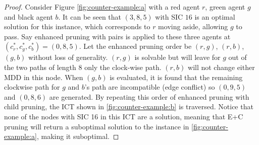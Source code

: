 \documentclass[english,10pt]{article}
\begin{document}
	\begin{proof}
		Consider Figure \ref{fig:counter-example:a} with a red agent $r$, green agent $g$ and black agent $b$. It can be seen that $(3,8,5)$ with SIC $16$ is an optimal solution for this instance, which corresponds to $r$ moving aside, allowing $g$ to pass.  Say enhanced pruning with pairs is applied to these three agents at $(c^*_r,c^*_g,c^*_b) = (0,8,5)$. Let the enhanced pruning order be $(r,g)$, $(r,b)$, $(g,b)$ without loss of generality. $(r,g)$ is solvable but will leave for $g$ out of the two paths of length $8$ only the clock-wise path. $(r,b)$ will not change either MDD in this node. When $(g,b)$ is evaluated, it is found that the remaining clockwise path for $g$ and $b$'s path are incompatible (edge conflict) so $(0,9,5)$ and $(0,8,6)$ are generated. By repeating this order of enhanced pruning with child pruning, the ICT shown in \ref{fig:counter-example:b} is traversed. Notice that none of the nodes with SIC 16 in this ICT are a solution, meaning that E+C pruning will return a suboptimal solution to the instance in \ref{fig:counter-example:a}, making it suboptimal.
	\end{proof}
\end{document}

